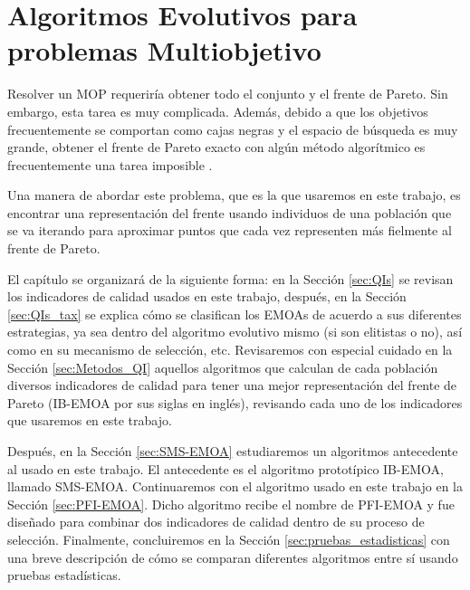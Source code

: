 

\chapter{Algoritmos Evolutivos para problemas Multiobjetivo}

Resolver un MOP requeriría obtener todo el conjunto y el frente de Pareto. Sin embargo, esta tarea es muy complicada. Además, debido a que los objetivos frecuentemente se comportan como cajas negras y el espacio de búsqueda es muy grande, obtener el frente de Pareto exacto con algún método algorítmico es frecuentemente una tarea imposible \cite{SMS-EMOA}. 

Una manera de abordar este problema, que es la que usaremos en este trabajo, es encontrar una representación del frente usando individuos de una población que se va iterando para aproximar puntos que cada vez representen más fielmente al frente de Pareto.

El capítulo se organizará de la siguiente forma: en la Sección \ref{sec:QIs} se revisan los indicadores de calidad usados en este trabajo, después, en la Sección \ref{sec:QIs_tax} se explica cómo se clasifican los EMOAs de acuerdo a sus diferentes estrategias, ya sea dentro del algoritmo evolutivo mismo (si son elitistas o no), así como en su mecanismo de selección, etc. Revisaremos con especial cuidado en la Sección \ref{sec:Metodos_QI} aquellos algoritmos que calculan de cada población diversos indicadores de calidad para tener una mejor representación del frente de Pareto (IB-EMOA por sus siglas en inglés), revisando cada uno de los indicadores que usaremos en este trabajo. 

Después, en la Sección \ref{sec:SMS-EMOA} estudiaremos un algoritmos antecedente al usado en este trabajo. El antecedente es el algoritmo prototípico IB-EMOA, llamado SMS-EMOA. Continuaremos con el algoritmo usado en este trabajo en la Sección \ref{sec:PFI-EMOA}. Dicho algoritmo recibe el nombre de PFI-EMOA y fue diseñado para combinar dos indicadores de calidad dentro de su proceso de selección. Finalmente, concluiremos en la Sección \ref{sec:pruebas_estadisticas} con una breve descripción de cómo se comparan diferentes algoritmos entre sí usando pruebas estadísticas.

